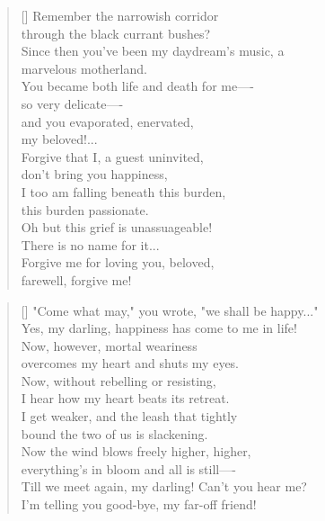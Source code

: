 \documentclass[]{article}
\begin{document}
\settowidth{\versewidth}{Remember the narrowish corridor .   }
\begin{verse}[\versewidth]
Remember the narrowish corridor\\
through the black currant bushes?\\
Since then you've been my daydream's music, a\\
marvelous motherland.\\
You became both life and death for me—- \\
so very delicate—- \\
and you evaporated, enervated,\\
my beloved!... \\
Forgive that I, a guest uninvited,\\
don't bring you happiness, \\
I too am falling beneath this burden,\\
this burden passionate.\\
Oh but this grief is unassuageable!\\
There is no name for it... \\
Forgive me for loving you, beloved,\\
farewell, forgive me!\\
\end{verse}
\bigskip \bigskip

\settowidth{\versewidth}{"Come what may," you wrote, "we shall be}
\begin{verse}[\versewidth]
"Come what may," you wrote, "we shall be happy..."\\
Yes, my darling, happiness has come to me in life!\\
Now, however, mortal weariness\\
overcomes my heart and shuts my eyes.\\
Now, without rebelling or resisting,\\
I hear how my heart beats its retreat.\\
I get weaker, and the leash that tightly\\
bound the two of us is slackening.\\
Now the wind blows freely higher, higher,\\
everything's in bloom and all is still—- \\
Till we meet again, my darling! Can't you hear me?\\
I'm telling you good-bye, my far-off friend!\\
\end{verse}
\bigskip \bigskip
\end{document}
